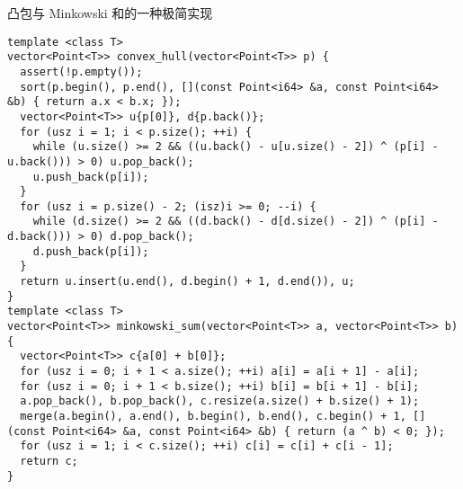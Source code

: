 凸包与 Minkowski 和的一种极简实现

\begin{verbatim}
template <class T>
vector<Point<T>> convex_hull(vector<Point<T>> p) {
  assert(!p.empty());
  sort(p.begin(), p.end(), [](const Point<i64> &a, const Point<i64> &b) { return a.x < b.x; });
  vector<Point<T>> u{p[0]}, d{p.back()};
  for (usz i = 1; i < p.size(); ++i) {
    while (u.size() >= 2 && ((u.back() - u[u.size() - 2]) ^ (p[i] - u.back())) > 0) u.pop_back();
    u.push_back(p[i]);
  }
  for (usz i = p.size() - 2; (isz)i >= 0; --i) {
    while (d.size() >= 2 && ((d.back() - d[d.size() - 2]) ^ (p[i] - d.back())) > 0) d.pop_back();
    d.push_back(p[i]);
  }
  return u.insert(u.end(), d.begin() + 1, d.end()), u;
}
template <class T>
vector<Point<T>> minkowski_sum(vector<Point<T>> a, vector<Point<T>> b) {
  vector<Point<T>> c{a[0] + b[0]};
  for (usz i = 0; i + 1 < a.size(); ++i) a[i] = a[i + 1] - a[i];
  for (usz i = 0; i + 1 < b.size(); ++i) b[i] = b[i + 1] - b[i];
  a.pop_back(), b.pop_back(), c.resize(a.size() + b.size() + 1);
  merge(a.begin(), a.end(), b.begin(), b.end(), c.begin() + 1, [](const Point<i64> &a, const Point<i64> &b) { return (a ^ b) < 0; });
  for (usz i = 1; i < c.size(); ++i) c[i] = c[i] + c[i - 1];
  return c;
}
\end{verbatim}